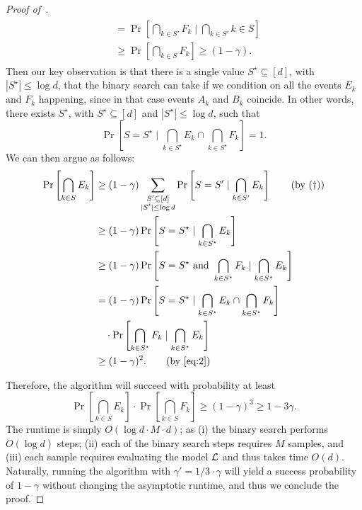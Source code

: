 \begin{proof}[Proof of~]
\begin{align}
\begin{split}
	&= \Pr\left[\bigcap_{k \in S'} F_k \mid \bigcap_{k \in S'} {k \in S}\right] \\
	&\geq \Pr\left[\bigcap_{k \in S} F_k\right] \geq (1-\gamma).
	\end{split}
\end{align}
Then our key observation is that there is a single value $S^\star \subseteq [d]$, with $|S^\star| \leq \log d$, that the binary search can take if we condition on all the events $E_k$ and $F_k$ happening, since in that case events $A_k$ and $B_k$ coincide. In other words, there exists $S^\star$, with $S^\star \subseteq [d]$ and $|S^\star| \leq \log d$, such that
\[ 
\Pr\left[S = S^\star \mid \bigcap_{k \in S^\star} E_k \cap \bigcap_{k \in S^\star} F_k\right] = 1.
\]
We can then argue as follows:
\begin{align*}
	\Pr\left[\bigcap_{k \in S} E_k\right] &\geq (1-\gamma) \sum_{\substack{S' \subseteq [d]\\ |S'| \leq \log d}} \Pr\left[S = S' \mid \bigcap_{k \in S'} E_k\right]\tag{by $(\dagger)$}\\
	&\geq (1-\gamma) \Pr\left[S = S^\star  \mid \bigcap_{k \in S^\star} E_k \right]\\
	&\geq (1-\gamma) \Pr\left[S = S^\star \text{ and } \bigcap_{k \in S^\star} F_k \mid \bigcap_{k \in S^\star} E_k \right]\\
	&= (1-\gamma) \Pr\left[S = S^\star \mid \bigcap_{k \in S^\star} E_k \cap \bigcap_{k \in S^\star} F_k\right]\\
	&\quad \cdot \Pr\left[\bigcap_{k \in S^\star} F_k \mid \bigcap_{k \in S^\star} E_k\right]\\
	&\geq (1-\gamma)^2. \tag{by~\Cref{eq:2}}
\end{align*}


Therefore, the algorithm will succeed with probability at least 
\[ 
	\Pr\left[\bigcap_{k \in S} E_k\right] \cdot \Pr\left[\bigcap_{k \in S} F_k\right] \geq (1-\gamma)^3 \geq 1-3\gamma.
\]
The runtime is simply
$O(\log d \cdot M \cdot d  )$; as (i) the binary search performs $O(\log d)$ steps; (ii) each of the binary search steps requires $M$ samples, and (iii) each sample requires evaluating the model $\mathcal{L}$ and thus takes time $O(d)$. Naturally, running the algorithm with $\gamma' = 1/3 \cdot \gamma$ will yield a success probability of $1-\gamma$ without changing the asymptotic runtime, and thus we conclude the proof.



\end{proof}
